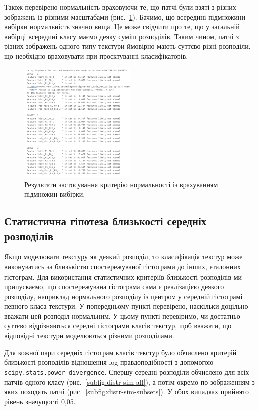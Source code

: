 Також перевірено нормальність враховуючи те, що патчі були взяті з різних зображень із різними масштабами (рис.~\ref{fig:normaltest-subsets}).
Бачимо, що всередині підмножини вибірки нормальність значно вища.
Це може свідчити про те, що у загальній вибірці всередині класу маємо деяку суміш розподілів.
Таким чином, патчі з різних зображень одного типу текстури ймовірно мають суттєво різні розподіли, що необхідно враховувати при проєктуванні класифікаторів.

\begin{figure}[h]
    \centering
    \includegraphics[width=0.5\textwidth]{img/normality-test-subsets.png}
    \caption{
        Результати застосування критерію нормальності із врахуванням підмножин вибірки.
    }
    \label{fig:normaltest-subsets}
\end{figure}


\subsection{Статистична гіпотеза близькості середніх розподілів}\label{section2.1c2}\hfill

Якщо моделювати текстуру як деякий розподіл, то класифікація текстур може виконуватись за близькістю 
спостережуваної гістограми до інших, еталонних гістограм. 
Для використання статистичних критеріїв близькості розподілів ми припускаємо, 
що спостережувана гістограма сама є реалізацією деякого розподілу, 
наприклад нормального розподілу із центром у середній гістограмі певного класа текстури.
У попередньому пункті перевірено, наскільки доцільно вважати цей розподіл нормальним.
У цьому пункті перевіримо, чи достатньо суттєво відрізняються середні гістограми класів текстур, щоб вважати, 
що відповідні текстури моделюються різними розподілами.

Для кожної пари середніх гістограм класів текстур було обчислено критерій близькості розподілів відношення log-правдоподібності 
з допомогою \verb|scipy.stats.power_divergence|. %
Спершу середні розподіли обчислено для всіх патчів одного класу (рис.~\ref{subfig:distr-sim-all}), а потім окремо по зображенням з яких походять патчі (рис.~\ref{subfig:distr-sim-subsets}). 
У обох випадках прийнято рівень значущості 0,05.

